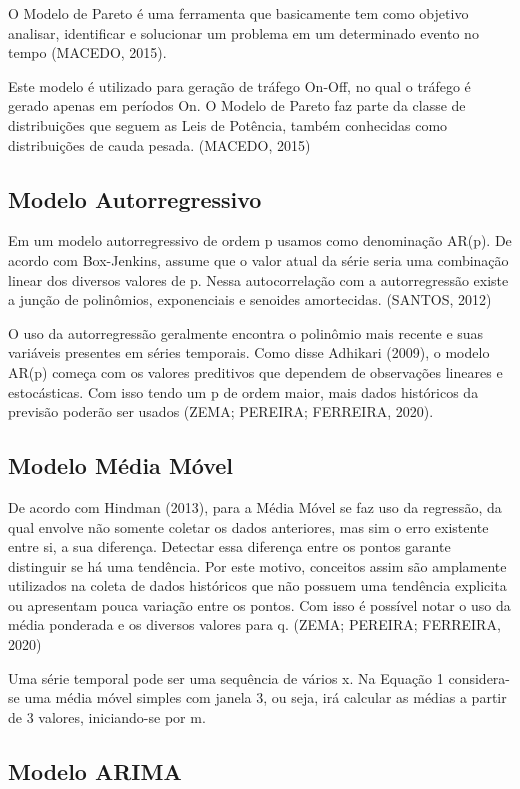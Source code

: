 \documentclass[
	12pt,				%
	openright,			%
	twoside,			%
	a4paper,			%
	english,			%
	french,				%
	spanish,			%
	brazil				%
	]{abntex2}
\begin{document}
O Modelo de Pareto é uma ferramenta que basicamente tem como objetivo analisar, identificar e solucionar um problema em um determinado evento no tempo (MACEDO, 2015).

Este modelo é utilizado para geração de tráfego On-Off, no qual o tráfego é gerado apenas em períodos On. O Modelo de Pareto faz parte da classe de distribuições que seguem as Leis de Potência, também conhecidas como distribuições de cauda pesada. (MACEDO, 2015)


\subsection{Modelo Autorregressivo}

Em um modelo autorregressivo de ordem p usamos como denominação AR(p). De acordo com Box-Jenkins, assume que o valor atual da série seria uma combinação linear dos diversos valores de p. Nessa autocorrelação com a autorregressão existe a junção de polinômios, exponenciais e senoides amortecidas. (SANTOS, 2012)

O uso da autorregressão geralmente encontra o polinômio mais recente e suas variáveis presentes em séries temporais. Como disse Adhikari (2009), o modelo AR(p) começa com os valores preditivos que dependem de observações lineares e estocásticas. Com isso tendo um p de ordem maior, mais dados históricos da previsão poderão ser usados (ZEMA; PEREIRA; FERREIRA, 2020).


\subsection{Modelo Média Móvel}

De acordo com Hindman (2013), para a Média Móvel se faz uso da regressão, da qual envolve não somente coletar os dados anteriores, mas sim o erro existente entre si, a sua diferença. Detectar essa diferença entre os pontos garante distinguir se há uma tendência. Por este motivo, conceitos assim são amplamente utilizados na coleta de dados históricos que não possuem uma tendência explicita ou apresentam pouca variação entre os pontos. Com isso é possível notar o uso da média ponderada e os diversos valores para q. (ZEMA; PEREIRA; FERREIRA, 2020)

Uma série temporal pode ser uma sequência de vários x. Na Equação 1 considera-se uma média móvel simples com janela 3, ou seja, irá calcular as médias a partir de 3 valores, iniciando-se por m.

\subsection{Modelo ARIMA}
\end{document}
